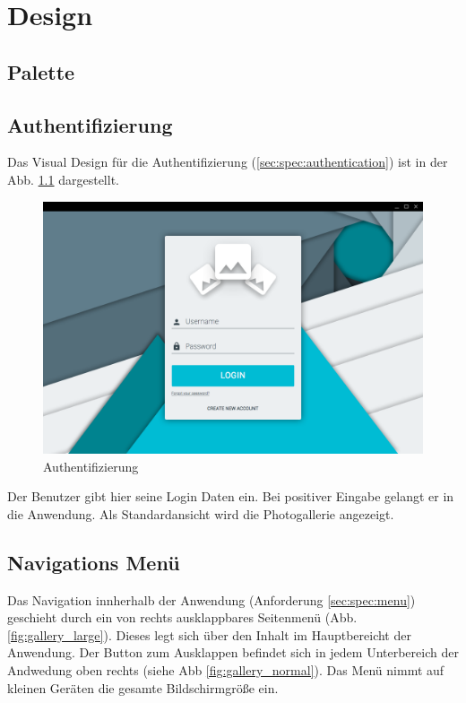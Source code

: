 \chapter{Design}

\section{Palette}

\section{Authentifizierung}

Das Visual Design für die Authentifizierung (\ref{sec:spec:authentication}) ist in der Abb. \ref{fig:login_form} dargestellt.

\begin{figure}[htp]     %
\centering
\includegraphics[width=1.0\textwidth]{images/login_form} 
\caption{Authentifizierung}\label{fig:login_form}
\end{figure}

Der Benutzer gibt hier seine Login Daten ein. Bei positiver Eingabe gelangt er
in die Anwendung. Als Standardansicht wird die Photogallerie angezeigt.

\section{Navigations Menü}

Das Navigation innherhalb der Anwendung (Anforderung \ref{sec:spec:menu}) geschieht durch ein von rechts ausklappbares Seitenmenü (Abb. \ref{fig:gallery_large}). Dieses legt sich über den Inhalt im Hauptbereicht der Anwendung. Der Button zum Ausklappen befindet sich in jedem Unterbereich der Andwedung oben rechts (siehe Abb \ref{fig:gallery_normal}). Das Menü nimmt auf kleinen Geräten die gesamte Bildschirmgröße ein.

